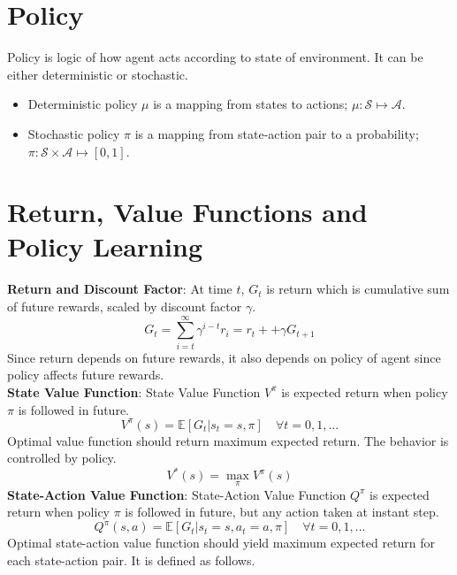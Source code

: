 \section{Policy}
Policy is logic of how agent acts according to state of environment. It can be either deterministic or stochastic. \\
\begin{itemize}
	\item Deterministic policy $\mu$ is a mapping from states to actions; $\mu \colon \mathcal{S} \mapsto \mathcal{A}$.
	\item Stochastic policy $\pi$ is a mapping from state-action pair to a probability; $\pi \colon \mathcal{S} \times \mathcal{A} \mapsto [0,1]$.
\end{itemize}
\section{Return, Value Functions and Policy Learning}
\textbf{Return and Discount Factor}: At time $t$, $G_t$ is return which is cumulative sum of future rewards, scaled by discount factor $\gamma$. \\
\begin{equation}
G_t = \sum_{i=t}^{\infty} \gamma^{i-t} r_i = r_t + + \gamma G_{t+1}
\end{equation}
Since return depends on future rewards, it also depends on policy of agent since policy affects future rewards. \\
\textbf{State Value Function}: State Value Function $V^{\pi}$ is expected return when policy $\pi$ is followed in future. \\
\begin{equation}
V^{\pi}(s) = \mathbb{E}[G_t|s_t=s, \pi] \quad \forall t = 0,1, ...
\end{equation}
Optimal value function should return maximum expected return. The behavior is controlled by policy. \\
\begin{equation}
V^{*}(s) = \max_{\pi} V^{\pi}(s)
\end{equation}
\textbf{State-Action Value Function}: State-Action Value Function $Q^{\pi}$ is expected return when policy $\pi$ is followed in future, but any action taken at instant step. \\
\begin{equation}
Q^{\pi}(s,a) = \mathbb{E}[G_t|s_t=s, a_t=a, \pi] \quad \forall t = 0,1, ...
\end{equation}
Optimal state-action value function should yield maximum expected return for each state-action pair. It is defined as follows. \\
